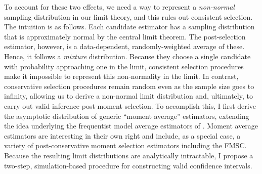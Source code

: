 To account for these two effects, we need a way to represent a \emph{non-normal} sampling distribution in our limit theory, and this rules out consistent selection.
The intuition is as follows.
Each candidate estimator has a sampling distribution that is approximately normal by the central limit theorem.
The post-selection estimator, however, is a data-dependent, randomly-weighted average of these.
Hence, it follows a \emph{mixture} distribution.
Because they choose a single candidate with probability approaching one in the limit, consistent selection procedures make it impossible to represent this non-normality in the limit.
In contrast, conservative selection procedures remain random even as the sample size goes to infinity, allowing us to derive a non-normal limit distribution and, ultimately, to carry out valid inference post-moment selection.
To accomplish this, I first derive the asymptotic distribution of generic ``moment average'' estimators, extending the idea underlying the frequentist model average estimators of \cite{HjortClaeskens}.
Moment average estimators are interesting in their own right and include, as a special case, a variety of post-conservative moment selection estimators including the FMSC.
Because the resulting limit distributions are analytically intractable, I propose a two-step, simulation-based procedure for constructing valid confidence intervals.

